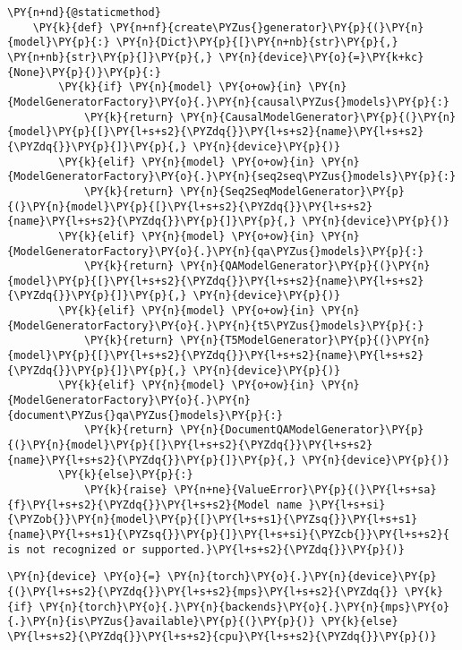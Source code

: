 \documentclass[11pt]{wseas}
\begin{document}
\begin{tcolorbox}[breakable, size=fbox, boxrule=1pt, pad at break*=1mm,colback=cellbackground, colframe=cellborder]
\begin{Verbatim}[commandchars=\\\{\}]
    \PY{n+nd}{@staticmethod}
    \PY{k}{def} \PY{n+nf}{create\PYZus{}generator}\PY{p}{(}\PY{n}{model}\PY{p}{:} \PY{n}{Dict}\PY{p}{[}\PY{n+nb}{str}\PY{p}{,} \PY{n+nb}{str}\PY{p}{]}\PY{p}{,} \PY{n}{device}\PY{o}{=}\PY{k+kc}{None}\PY{p}{)}\PY{p}{:}
        \PY{k}{if} \PY{n}{model} \PY{o+ow}{in} \PY{n}{ModelGeneratorFactory}\PY{o}{.}\PY{n}{causal\PYZus{}models}\PY{p}{:}
            \PY{k}{return} \PY{n}{CausalModelGenerator}\PY{p}{(}\PY{n}{model}\PY{p}{[}\PY{l+s+s2}{\PYZdq{}}\PY{l+s+s2}{name}\PY{l+s+s2}{\PYZdq{}}\PY{p}{]}\PY{p}{,} \PY{n}{device}\PY{p}{)}
        \PY{k}{elif} \PY{n}{model} \PY{o+ow}{in} \PY{n}{ModelGeneratorFactory}\PY{o}{.}\PY{n}{seq2seq\PYZus{}models}\PY{p}{:}
            \PY{k}{return} \PY{n}{Seq2SeqModelGenerator}\PY{p}{(}\PY{n}{model}\PY{p}{[}\PY{l+s+s2}{\PYZdq{}}\PY{l+s+s2}{name}\PY{l+s+s2}{\PYZdq{}}\PY{p}{]}\PY{p}{,} \PY{n}{device}\PY{p}{)}
        \PY{k}{elif} \PY{n}{model} \PY{o+ow}{in} \PY{n}{ModelGeneratorFactory}\PY{o}{.}\PY{n}{qa\PYZus{}models}\PY{p}{:}
            \PY{k}{return} \PY{n}{QAModelGenerator}\PY{p}{(}\PY{n}{model}\PY{p}{[}\PY{l+s+s2}{\PYZdq{}}\PY{l+s+s2}{name}\PY{l+s+s2}{\PYZdq{}}\PY{p}{]}\PY{p}{,} \PY{n}{device}\PY{p}{)}
        \PY{k}{elif} \PY{n}{model} \PY{o+ow}{in} \PY{n}{ModelGeneratorFactory}\PY{o}{.}\PY{n}{t5\PYZus{}models}\PY{p}{:}
            \PY{k}{return} \PY{n}{T5ModelGenerator}\PY{p}{(}\PY{n}{model}\PY{p}{[}\PY{l+s+s2}{\PYZdq{}}\PY{l+s+s2}{name}\PY{l+s+s2}{\PYZdq{}}\PY{p}{]}\PY{p}{,} \PY{n}{device}\PY{p}{)}
        \PY{k}{elif} \PY{n}{model} \PY{o+ow}{in} \PY{n}{ModelGeneratorFactory}\PY{o}{.}\PY{n}{document\PYZus{}qa\PYZus{}models}\PY{p}{:}
            \PY{k}{return} \PY{n}{DocumentQAModelGenerator}\PY{p}{(}\PY{n}{model}\PY{p}{[}\PY{l+s+s2}{\PYZdq{}}\PY{l+s+s2}{name}\PY{l+s+s2}{\PYZdq{}}\PY{p}{]}\PY{p}{,} \PY{n}{device}\PY{p}{)}
        \PY{k}{else}\PY{p}{:}
            \PY{k}{raise} \PY{n+ne}{ValueError}\PY{p}{(}\PY{l+s+sa}{f}\PY{l+s+s2}{\PYZdq{}}\PY{l+s+s2}{Model name }\PY{l+s+si}{\PYZob{}}\PY{n}{model}\PY{p}{[}\PY{l+s+s1}{\PYZsq{}}\PY{l+s+s1}{name}\PY{l+s+s1}{\PYZsq{}}\PY{p}{]}\PY{l+s+si}{\PYZcb{}}\PY{l+s+s2}{ is not recognized or supported.}\PY{l+s+s2}{\PYZdq{}}\PY{p}{)}
\end{Verbatim}
\end{tcolorbox}

    \begin{tcolorbox}[breakable, size=fbox, boxrule=1pt, pad at break*=1mm,colback=cellbackground, colframe=cellborder]
\begin{Verbatim}[commandchars=\\\{\}]
\PY{n}{device} \PY{o}{=} \PY{n}{torch}\PY{o}{.}\PY{n}{device}\PY{p}{(}\PY{l+s+s2}{\PYZdq{}}\PY{l+s+s2}{mps}\PY{l+s+s2}{\PYZdq{}} \PY{k}{if} \PY{n}{torch}\PY{o}{.}\PY{n}{backends}\PY{o}{.}\PY{n}{mps}\PY{o}{.}\PY{n}{is\PYZus{}available}\PY{p}{(}\PY{p}{)} \PY{k}{else} \PY{l+s+s2}{\PYZdq{}}\PY{l+s+s2}{cpu}\PY{l+s+s2}{\PYZdq{}}\PY{p}{)}
\end{Verbatim}
\end{tcolorbox}
\end{document}
